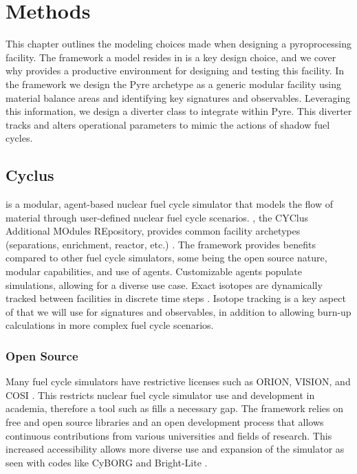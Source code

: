 \chapter[Methods]{Methods}
This chapter outlines the modeling choices made when designing a pyroprocessing facility. 
The framework a model resides in is a key design choice, and we cover why \Cyclus provides
a productive environment for designing and testing this facility. In the \Cyclus framework we
design the Pyre archetype as a generic modular facility using material balance areas and identifying key signatures and observables. Leveraging this information, we design a diverter class to integrate within Pyre. This diverter tracks and alters operational parameters to mimic
the actions of shadow fuel cycles.

\section{Cyclus}

\Cyclus is a modular, agent-based nuclear fuel cycle simulator that models the flow of material through user-defined nuclear fuel cycle scenarios. \Cycamore, the CYClus 
Additional MOdules REpository, provides common facility archetypes (separations, enrichment, reactor, etc.) \cite{carlsen_cycamore_2014}. 
The \Cyclus framework provides benefits compared to other fuel cycle simulators, some being the open source nature, modular capabilities, and use of agents.
Customizable agents populate simulations, allowing for a diverse use case. Exact isotopes are dynamically tracked between facilities in discrete time steps \cite{huff_fundamental_2016}.
Isotope tracking is a key aspect of \Cyclus that we will use for signatures and observables, in addition to allowing burn-up calculations in more complex fuel cycle scenarios.

\subsection{Open Source}

Many fuel cycle simulators have restrictive licenses such as ORION, VISION, and COSI \cite{yacout_vision_2006,zimmerman_orion_2007,coquelet-pascal_cosi6:_2015}. This restricts
nuclear fuel cycle simulator use and development in academia, therefore a tool such as \Cyclus fills a necessary gap. The \Cyclus framework relies on
free and open source libraries and an open development process that allows continuous contributions from various universities and fields of research. This increased accessibility allows
more diverse use and expansion of the simulator as seen with codes like CyBORG and Bright-Lite \cite{skutnik_cyborg:_2016,schneider_integrated_2016}.


